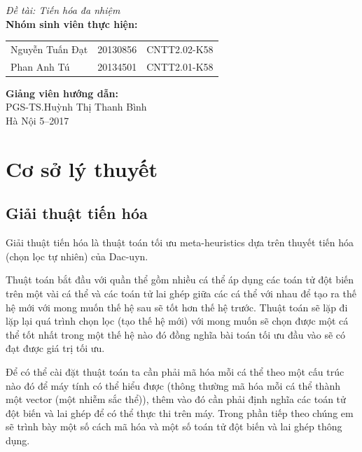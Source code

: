 \documentclass[a4paper,12pt]{report}
\renewcommand{\contentsname}{Mục lục}
\begin{document}
\begin{center}
{\fontsize{18}{20}\selectfont \emph{Đề tài: Tiến hóa đa nhiệm }}\\[2cm]
\hspace{-5cm}\fontsize{14}{16}\selectfont \textbf{Nhóm sinh viên thực hiện:}\\[0.1cm] 
\begin{longtable}{l c c}
Nguyễn Tuấn Đạt & 20130856 & CNTT2.02-K58 \\
Phan Anh Tú &   20134501 & CNTT2.01-K58\\
\end{longtable}
\vspace{0.5cm}
\hspace{-6cm}\fontsize{14}{16}\selectfont \textbf{Giảng viên hướng dẫn:}\\[0.1cm]
\hspace{-2.7cm}\fontsize{14}{16}\selectfont PGS-TS.Huỳnh Thị Thanh Bình \\[3cm]
\fontsize{16}{19}\selectfont Hà Nội 5--2017
\end{center}
\newpage
\pdfbookmark{\contentsname}{toc}
\tableofcontents
\listoffigures

\chapter{Cơ sở lý thuyết}
\section{Giải thuật tiến hóa}
Giải thuật tiến hóa là thuật toán tối ưu meta-heuristics dựa trên thuyết tiến hóa (chọn lọc tự nhiên) của Dac-uyn.
\par Thuật toán bắt đầu với quần thể gồm nhiều cá thể áp dụng các toán tử đột biến trên một vài cá thể và các toán tử lai ghép giữa các cá thể với nhau để tạo ra thế hệ mới với mong muốn thế hệ sau sẽ tốt hơn thế hệ trước. Thuật toán sẽ lặp đi lặp lại quá trình chọn lọc (tạo thế hệ mới) với mong muốn sẽ chọn được một cá thể tốt nhất trong một thế hệ nào đó đồng nghĩa bài toán tối ưu đầu vào sẽ có đạt được giá trị tối ưu.
\par Để có thể cài đặt thuật toán ta cần phải mã hóa mỗi cá thể theo một cấu trúc nào đó để máy tính có thể hiểu được (thông thường mã hóa mỗi cá thể thành một vector (một nhiễm sắc thể)), thêm vào đó cần phải định nghĩa các toán tử đột biến và lai ghép để có thể thực thi trên máy. Trong phần tiếp theo chúng em sẽ trình bày một số cách mã hóa và một số toán tử đột biến và lai ghép thông dụng.
\end{document}
